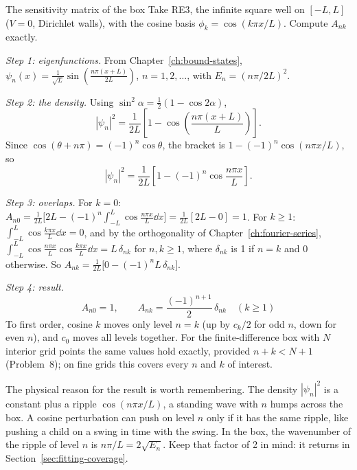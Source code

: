 \begin{sample}{The sensitivity matrix of the box}
Take RE3, the infinite square well on $[-L,L]$ ($V=0$, Dirichlet walls), with the cosine basis $\phi_k=\cos(k\pi x/L)$. Compute $A_{nk}$ exactly.

\emph{Step 1: eigenfunctions.} From Chapter~\ref{ch:bound-states}, $\psi_n(x)=\frac{1}{\sqrt L}\sin\!\left(\frac{n\pi(x+L)}{2L}\right)$, $n=1,2,\dots$, with $E_n=(n\pi/2L)^2$.

\emph{Step 2: the density.} Using $\sin^2\alpha=\tfrac12(1-\cos2\alpha)$,
\[
|\psi_n|^2=\frac{1}{2L}\left[1-\cos\!\left(\frac{n\pi(x+L)}{L}\right)\right].
\]
Since $\cos(\theta+n\pi)=(-1)^n\cos\theta$, the bracket is $1-(-1)^n\cos(n\pi x/L)$, so
\[
|\psi_n|^2=\frac{1}{2L}\left[1-(-1)^n\cos\frac{n\pi x}{L}\right].
\]

\emph{Step 3: overlaps.} For $k=0$: $A_{n0}=\frac{1}{2L}\bigl[2L-(-1)^n\int_{-L}^L\cos\frac{n\pi x}{L}\dd x\bigr]=\frac{1}{2L}[2L-0]=1$. For $k\ge1$: $\int_{-L}^L\cos\frac{k\pi x}{L}\dd x=0$, and by the orthogonality of Chapter~\ref{ch:fourier-series}, $\int_{-L}^L\cos\frac{n\pi x}{L}\cos\frac{k\pi x}{L}\dd x=L\,\delta_{nk}$ for $n,k\ge1$, where $\delta_{nk}$ is 1 if $n=k$ and 0 otherwise. So $A_{nk}=\frac{1}{2L}\bigl[0-(-1)^nL\,\delta_{nk}\bigr]$.

\emph{Step 4: result.}
\[
\boxed{A_{n0}=1,\qquad A_{nk}=\frac{(-1)^{n+1}}{2}\,\delta_{nk}\quad(k\ge1)}
\]
To first order, cosine $k$ moves only level $n=k$ (up by $c_k/2$ for odd $n$, down for even $n$), and $c_0$ moves all levels together. For the finite-difference box with $N$ interior grid points the same values hold exactly, provided $n+k<N+1$ (Problem~8); on fine grids this covers every $n$ and $k$ of interest.
\end{sample}

The physical reason for the result is worth remembering. The density $|\psi_n|^2$ is a constant plus a ripple $\cos(n\pi x/L)$, a standing wave with $n$ humps across the box. A cosine perturbation can push on level $n$ only if it has the same ripple, like pushing a child on a swing in time with the swing. In the box, the wavenumber of the ripple of level $n$ is $n\pi/L=2\sqrt{E_n}$. Keep that factor of 2 in mind: it returns in Section~\ref{sec:fitting-coverage}.

